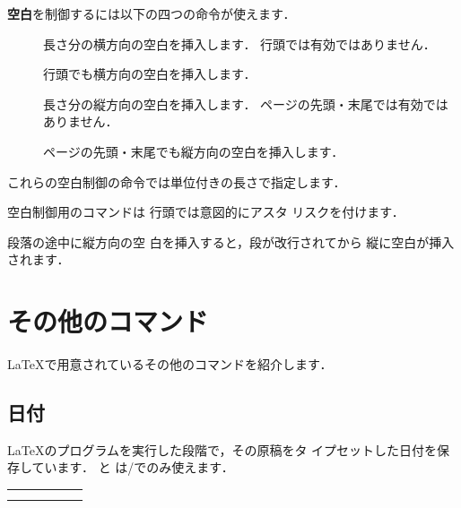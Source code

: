 


\textbf{空白}を制御するには以下の四つの命令が使えます．
\begin{description}
\item[] 
  長さ分の横方向の空白を挿入します．
  行頭では有効ではありません．
\item[]
  行頭でも横方向の空白を挿入します．
\item[]
  長さ分の縦方向の空白を挿入します．
  ページの先頭・末尾では有効ではありません．
\item[] 
  ページの先頭・末尾でも縦方向の空白を挿入します．
\end{description}
これらの空白制御の命令では単位付きの長さで指定します．
\begin{InOut}
\hspace{1cm}空白制御用のコマンドは
行頭では意図的に\vspace{1cm}アスタ
リスクを付けます．\par\hspace{1cm}
段落の途中に縦方向\hspace{1cm}の空
白を挿入すると，段が改行されてから
縦に空白が挿入されます．
\end{InOut}



\section{その他のコマンド}
{\LaTeX}で用意されているその他のコマンドを紹介します．

\subsection{日付}
{\LaTeX}のプログラムを実行した段階で，その原稿をタ
イプセットした日付を保存しています． と 
は/でのみ使えます．
\begin{Syntax}
\begin{tabular}{*6l}
\C{today}&\pp{\Z{日付}} & \C{month}&\pp{\Z{月}} & \C{hour}  &\pp{\Z{時}}\\
\C{year} &\pp{\Z{年}}   & \C{day}  &\pp{\Z{日}} & \C{minute}&\pp{\Z{分}}\\
\end{tabular}
\end{Syntax}

